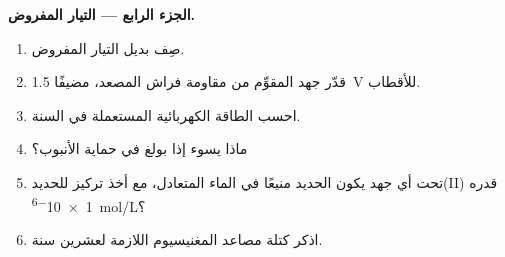 \begin{problem}
\medskip
\noindent\textbf{الجزء الرابع --- التيار المفروض.}
\begin{enumerate}[resume]
  \item صِف بديل التيار المفروض.
  \item قدّر جهد المقوِّم من مقاومة فراش المصعد،
        مضيفًا \qty{1.5}{V} للأقطاب.
  \item احسب الطاقة الكهربائية المستعملة في السنة.
  \item ماذا يسوء إذا بولغ في حماية الأنبوب؟
  \item تحت أي جهد يكون الحديد منيعًا في الماء المتعادل، مع أخذ
        تركيز للحديد(II) قدره \qty{1e-6}{mol/L}؟
  \item اذكر كتلة مصاعد المغنيسيوم اللازمة لعشرين سنة.
\end{enumerate}
\end{problem}
